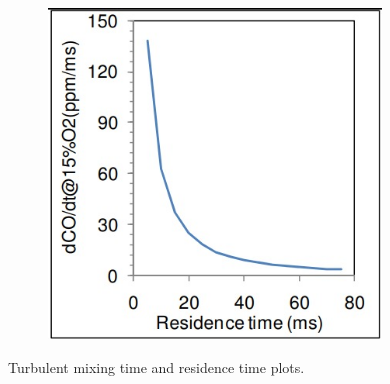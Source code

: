 \begin{figure}[!ht]
\begin{subfigure}[t]{0.3\textwidth}
        \label{fig:residenceTimeVsIntensity}
    \end{subfigure}
\hfill
    \begin{subfigure}[t]{0.3\textwidth}
        \centering
        \includegraphics[width=0.97\textwidth]{Chapter3/Images/conversionRateCOtoCo2.jpeg}
        \label{fig:conversionRateCOtoCo2}
    \end{subfigure}
\caption{Turbulent mixing time and residence time plots.}
\label{fig:residenceTimePlots}
\end{figure}
